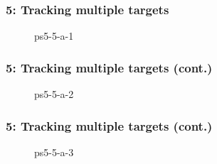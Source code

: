 \documentclass[../report.tex]{subfiles}
\begin{document}
    
    \begin{frame}
        \frametitle{5: Tracking multiple targets}
        \begin{figure}[!htb]
            \centering
            \caption{ps5-5-a-1}
        \end{figure}
    \end{frame}

    \begin{frame}
        \frametitle{5: Tracking multiple targets (cont.)}
        \begin{figure}[!htb]
            \centering
            \caption{ps5-5-a-2}
        \end{figure}
    \end{frame}

    \begin{frame}
        \frametitle{5: Tracking multiple targets (cont.)}
        \begin{figure}[!htb]
            \centering
            \caption{ps5-5-a-3}
        \end{figure}
    \end{frame}
\end{document}
